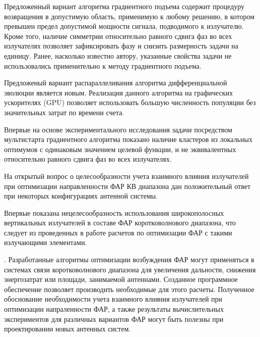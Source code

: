 Предложенный вариант алгоритма градиентного подъема содержит процедуру возвращения в допустимую область, применимую к любому решению, в котором превышен предел допустимой мощности сигнала, подводимого к излучателю.
Кроме того, наличие симметрии относительно равного сдвига фаз во всех излучателях позволяет зафиксировать фазу и снизить размерность задачи на единицу. Ранее, насколько известно  автору, указанные свойства задачи не использовались применительно к методу градиентного подъема.

Предложеный вариант распараллеливания алгоритма дифференциальной эволюции является новым. Реализация данного алгоритма на графических ускорителях (GPU) позволяет использовать большую численность популяции без значительных затрат по времени счета.
   
Впервые на основе экспериментального исследования задачи посредством мультистарта градиентного алгоритма показано наличие кластеров из локальных оптимумов с одинаковым значением целевой функции, и не эквивалентных относительно равного сдвига фаз во всех излучателях.

На открытый вопрос о целесообразности учета взаимного влияния излучателей при оптимизации направленности ФАР КВ диапазона дан положительный ответ при некоторых конфигурациях антенной системы. 

Впервые показана нецелесообразность использования широкополосных вертикальных излучателей в составе ФАР коротковолнового диапазона, что следует из проведенных в работе расчетов по оптимизации ФАР с такими излучающими элементами.

{\influence}. 
Разработанные алгоритмы оптимизации возбуждения ФАР могут  применяться в системах связи коротковолнового диапазона для увеличения дальности, снижения энергозатрат или площади, занимаемой антеннами. Созданное программное обеспечение позволяет производить необходимые для этого расчеты.
Полученное обоснование необходимости учета взаимного влияния излучателей при оптимизации напраленности ФАР, а также результаты вычислительных экспериментов для различных вариантов ФАР могут быть полезны при проектировании новых антенных систем. 
{\methods}

